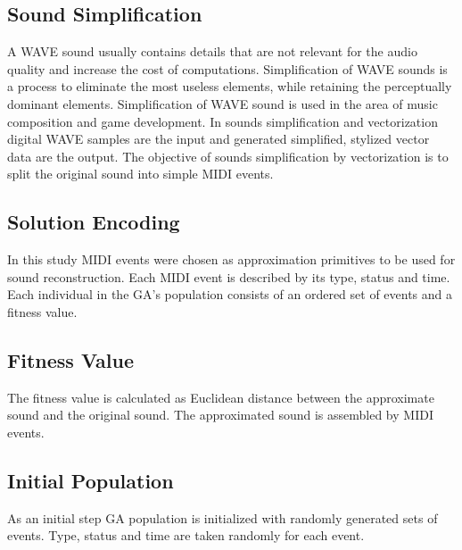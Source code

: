 \documentclass[a0,portrait,25pt]{sciposter}
\begin{document}
\begin{multicols}{3}
\begin{mdframed}[backgroundcolor=white,roundcorner=4pt,shadow=true,linewidth=1pt]
\color{Black}
\section*{Sound Simplification}
A WAVE sound usually contains details that are not relevant for the audio quality and increase the cost of computations. Simplification of WAVE sounds is a process to eliminate the most useless elements, while retaining the perceptually dominant elements. Simplification of WAVE sound is used in the area of music composition and game development. In sounds simplification and vectorization digital WAVE samples are the input and generated simplified, stylized vector data are the output. The objective of sounds simplification by vectorization is to split the original sound into simple MIDI events. 
\end{mdframed} 
 
\begin{mdframed}[backgroundcolor=white,roundcorner=4pt,shadow=true,linewidth=1pt]
\color{Black}
\section*{Solution Encoding}
In this study MIDI events were chosen as approximation primitives to be used for sound reconstruction. Each MIDI event is described by its type, status and time. Each individual in the GA's population consists of an ordered set of events and a fitness value. 
\end{mdframed} 
 
\begin{mdframed}[backgroundcolor=white,roundcorner=4pt,shadow=true,linewidth=1pt]
\color{Black}
\section*{Fitness Value}
The fitness value is calculated as Euclidean distance between the approximate sound and the original sound. The approximated sound is assembled by MIDI events. 
\end{mdframed} 
 
\begin{mdframed}[backgroundcolor=white,roundcorner=4pt,shadow=true,linewidth=1pt]
\color{Black}
\section*{Initial Population}
As an initial step GA population is initialized with randomly generated sets of events. Type, status and time are taken randomly for each event. 
\end{mdframed} 
 

\end{multicols}
\end{document}
